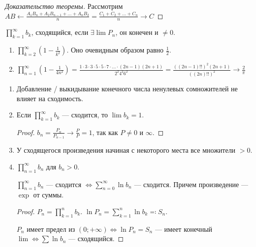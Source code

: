 \begin{proof}[Доказательство теоремы]
    Рассмотрим $AB \leftarrow \frac{A_1 B_n + A_2 B_{n-1} + \ldots + A_nB_2}{n} = \frac{C_1 + C_2 + \ldots + C_n}{n} \to C$
\end{proof}
\begin{definition}
    $\prod\limits_{k=1}^\infty b_k$, сходящийся, если  $\exists \lim P_n$, он конечен и  $\neq 0$.
\end{definition}
\begin{example}
    \begin{enumerate}
        \item $\prod\limits_{k=2}^\infty \left(1-\frac{1}{k^2}\right)$. Оно очевидным образом равно $\frac{1}{2}$.
        \item $\prod_{n=1}^\infty(1 - \frac{1}{4n^2}) = \frac{1 \cdot 3 \cdot 3 \cdot 5 \cdot 5 \cdot 7 \cdot \ldots \cdot (2n-1)(2n+1)}{2^2 4^2 6^2} = \frac{((2n-1)!!)^2(2n+1)}{((2n)!!)^2} \to \frac{2}{\pi}$
    \end{enumerate}
\end{example}
\begin{properties}
    \begin{enumerate}
        \item Добавление / выкидывание конечного числа ненулевых сомножителей не влияет на сходимость.
        \item Если  $\prod\limits_{k=1}^\infty b_k$ --- сходится, то  $\lim b_k = 1$.
             \begin{proof}
                $b_n = \frac{P_n}{P_{n-1}} \to \frac{P}{P} = 1$, так как $P \neq 0$ и  $\infty$.
            \end{proof}
        \item У сходящегося произведения начиная с некоторого места все множители $>0$. 
        \item  $\prod\limits_{n=1}^\infty b_n$ для  $b_n > 0$. 

             $\prod\limits_{n=1}^\infty b_n$ --- сходится  $\iff \sum\limits_{n = 0}^\infty \ln b_n$ --- сходится. Причем произведение --- $\exp$ от суммы.
\begin{proof}
    $P_n = \prod\limits_{k=1}^n b_k$.  $\ln P_n = \sum\limits_{k=1}^n \ln b_k \eqqcolon S_n$.

     $P_n$ имеет предел из  $(0; +\infty) \iff \ln P_n = S_n$ --- имеет конечный  $\lim \iff \sum \ln b_n$ --- сходящийся.
\end{proof}

    \end{enumerate}
\end{properties}

